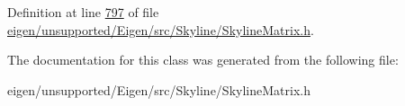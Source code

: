 Definition at line \hyperlink{eigen_2unsupported_2_eigen_2src_2_skyline_2_skyline_matrix_8h_source_l00797}{797} of file \hyperlink{eigen_2unsupported_2_eigen_2src_2_skyline_2_skyline_matrix_8h_source}{eigen/unsupported/\+Eigen/src/\+Skyline/\+Skyline\+Matrix.\+h}.



The documentation for this class was generated from the following file\+:\begin{DoxyCompactItemize}
\item 
eigen/unsupported/\+Eigen/src/\+Skyline/\+Skyline\+Matrix.\+h\end{DoxyCompactItemize}
